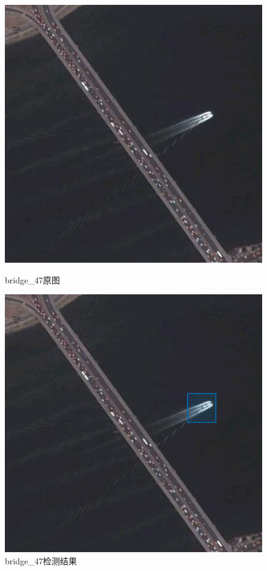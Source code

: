 \begin{figure}[H]
	\centering
	\begin{minipage}{0.45\linewidth}
		\includegraphics[width=\linewidth]{figure/bridge_47.jpg}
		\caption{bridge\_47原图}
	\end{minipage}
	\begin{minipage}{0.45\linewidth}
		\includegraphics[width=\linewidth]{figure/bridge_47_marked_ship.png}
		\caption{bridge\_47检测结果}
	\end{minipage}
\end{figure}
